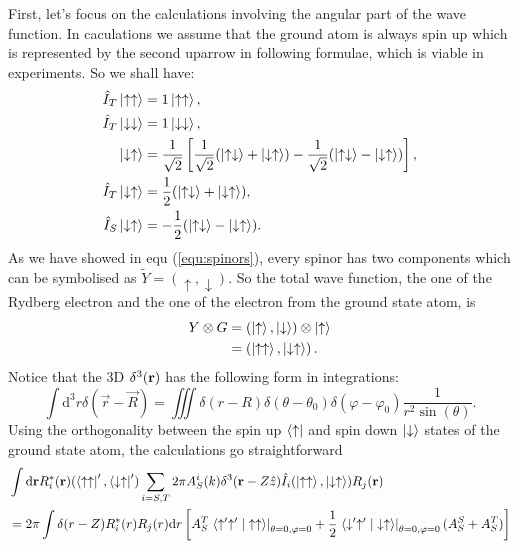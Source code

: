 \documentclass[british,english]{article}
\numberwithin{equation}{section}
\numberwithin{figure}{section}
\begin{document}
First, let's focus on the calculations involving the angular part of the wave function. In caculations we assume that the ground atom is always spin up which is represented by the second uparrow in following formulae, which is viable in experiments. So we shall have:
\begin{equation}
	\begin{aligned}
	\hat I_T\ket{\uparrow\uparrow}&=1\ket{\uparrow\uparrow},\\
	\hat I_T\ket{\downarrow\downarrow}&=1\ket{\downarrow\downarrow},\\
	\ket{\downarrow\uparrow}&=\frac{1}{\sqrt{2}}\left[\frac{1}{\sqrt{2}}(\ket{\uparrow\downarrow}+\ket{\downarrow\uparrow})-\frac{1}{\sqrt{2}}(\ket{\uparrow\downarrow}-\ket{\downarrow\uparrow})\right],\\
	\hat I_T\ket{\downarrow\uparrow}&=\frac{1}{2}(\ket{\uparrow\downarrow}+\ket{\downarrow\uparrow}),\\
	\hat I_S\ket{\downarrow\uparrow}&=-\frac{1}{2}(\ket{\uparrow\downarrow}-\ket{\downarrow\uparrow}).
	\end{aligned}
\end{equation}
As we have showed in equ (\ref{equ:spinors}), every spinor has two components which can be symbolised as $\tilde Y=(\uparrow,\downarrow)$. So the total wave function, the one of the Rydberg electron and the one of the electron from the ground state atom, is
\begin{equation} 
\begin{aligned}
Y\otimes G&=(\ket{\uparrow},\ket{\downarrow})\otimes \ket{\uparrow}\\
	  &=\left(\ket{\uparrow\uparrow},\ket{\downarrow\uparrow}\right).
\end{aligned}
\end{equation}
Notice that the 3D $\delta^3({\bf r})$ has the following form in integrations:
\begin{equation}
\int \mathrm d^3 r \delta(\vec r -\vec R)=\iiint\delta(r-R)\delta(\theta-\theta_0)\delta(\varphi-\varphi_0)\frac{1}{r^2\sin(\theta)}.
\end{equation}
Using the orthogonality between the spin up $\bra{\uparrow}$ and spin down $\ket{\downarrow}$ states of the ground state atom, the calculations go straightforward
\begin{equation}
\begin{aligned}
&\int \mathrm d {\bf r}R^*_i({\bf r})(\bra{\uparrow\uparrow}',\bra{\downarrow\uparrow}')\sum_{i=S,T}2\pi A^i_S(k)\delta^3({\bf r}-Z\hat z)\hat I_i(\ket{\uparrow\uparrow},\ket{\downarrow\uparrow})R_j({\bf r})\\
&=2\pi \int \delta(r-Z) R^*_i(r)R_j(r)\mathrm d r\left[A_S^T\left.\braket{\uparrow'\uparrow'|\uparrow\uparrow}\right|_{\theta=0,\varphi=0}+\frac 12 \left.\braket{\downarrow'\uparrow'|\downarrow\uparrow}\right|_{\theta=0,\varphi=0}(A_S^S+A_S^T)\right]
\end{aligned}
\label{equ:angularS}
\end{equation}
\end{document}
